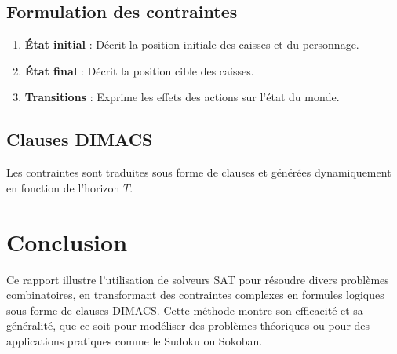 \documentclass[a4paper,12pt]{article}
\begin{document}
\subsection{Formulation des contraintes}
\begin{enumerate}
    \item \textbf{État initial} : Décrit la position initiale des caisses et du personnage.
    \item \textbf{État final} : Décrit la position cible des caisses.
    \item \textbf{Transitions} : Exprime les effets des actions sur l'état du monde.
\end{enumerate}

\subsection{Clauses DIMACS}
Les contraintes sont traduites sous forme de clauses et générées dynamiquement en fonction de l'horizon $T$. 

\section{Conclusion}
Ce rapport illustre l'utilisation de solveurs SAT pour résoudre divers problèmes combinatoires, en transformant des contraintes complexes en formules logiques sous forme de clauses DIMACS. Cette méthode montre son efficacité et sa généralité, que ce soit pour modéliser des problèmes théoriques ou pour des applications pratiques comme le Sudoku ou Sokoban.
\end{document}
